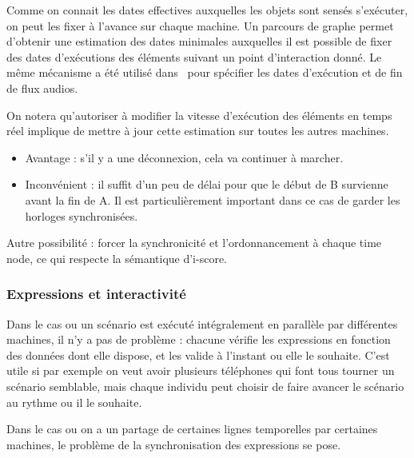 \documentclass{article}
\begin{document}
Comme on connait les dates effectives auxquelles les objets sont sensés s'exécuter, on peut les fixer à l'avance sur chaque machine. 
Un parcours de graphe permet d'obtenir une estimation des dates minimales auxquelles il est possible de fixer des dates d'exécutions des éléments suivant un point d'interaction donné.
Le même mécanisme a été utilisé dans~\cite{celerier2016rethinking} pour spécifier les dates d'exécution et de fin de flux audios.

On notera qu'autoriser à modifier la vitesse d'exécution des éléments en temps réel implique de mettre à jour cette estimation sur toutes les autres machines.

\begin{itemize}
\item Avantage : s'il y a une déconnexion, cela va continuer à marcher.
\item Inconvénient : il suffit d'un peu de délai pour que le début de B survienne avant la fin de A. 
Il est particulièrement important dans ce cas de garder les horloges synchronisées.
\end{itemize}

Autre possibilité : forcer la synchronicité et l'ordonnancement à chaque time node, ce qui respecte la sémantique d'i-score.

\begin{figure}[h]
	\centering
	\begin{tikzpicture}
	
	\end{tikzpicture}
	\label{scenar.non-interactif}
\end{figure}


\subsubsection{Expressions et interactivité}
Dans le cas ou un scénario est exécuté intégralement en parallèle par différentes machines, il n'y a pas de problème : chacune vérifie les expressions en fonction des données dont elle dispose, et les valide à l'instant ou elle le souhaite. C'est utile si par exemple on veut avoir plusieurs téléphones qui font tous tourner un scénario semblable, mais chaque individu peut choisir de faire avancer le scénario au rythme ou il le souhaite.

Dans le cas ou on a un partage de certaines lignes temporelles par certaines machines, le problème de la synchronisation des expressions se pose.
\end{document}
